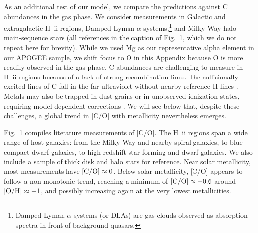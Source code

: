 \documentclass[fleqn,
usenatbib]{mnras}
\newcommand{\co}{{\rm [C/O]}}
\newcommand{\Hii}{H~{\sc ii}}
\newcommand{\about}[1]{${\sim} #1$}
\begin{document}
{\begin{figure}
\label{fig:gas_phase}
\end{figure}

As an additional test of our model, we compare the predictions against C abundances
in the gas phase. We consider measurements in Galactic and extragalactic \Hii{} regions, Damped Lyman-$\alpha$ systems,\footnote{Damped Lyman-$\alpha$ systems (or DLAs) are gas clouds observed as absorption spectra in front of background quasars.} and Milky Way halo main-sequence stars (all references in the caption of Fig.~\ref{fig:gas_phase}, which we do not repeat here for brevity).
While we used Mg as our representative alpha element in our APOGEE sample, we shift focus to O in this Appendix because O is more readily observed in the gas phase.
C abundances are challenging to measure in \Hii{} regions because of a lack of strong recombination lines. The collisionally excited lines of C fall in the far ultraviolet without nearby reference H lines \citep[][]{skillman+20}. 
Metals may also be trapped in dust grains or in unobserved ionization states, requiring model-dependent corrections \citep[e.g.,][]{MM19}.
We will see below that, despite these challenges, a global trend in [C/O] with metallicity nevertheless emerges.

Fig.~\ref{fig:gas_phase} compiles literature measurements of [C/O]. The \Hii{} regions span a wide range of host galaxies: from the Milky Way and nearby spiral galaxies, to blue compact dwarf galaxies, to high-redshift star-forming and dwarf galaxies. We also include a sample of thick disk and halo stars for reference. 
Near solar metallicity, most measurements have ${\rm [C/O]} \approx 0$.
Below solar metallicity, [C/O] appears to follow a non-monotonic trend, reaching a minimum of $\co  \approx -0.6$ around ${\rm [O/H]} \approx -1$, and possibly increasing again at the very lowest metallicities. 




}
\end{document}
